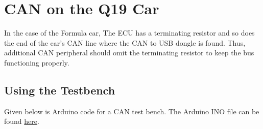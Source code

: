 \documentclass[letterpaper]{article}
\begin{document}
\section{CAN on the Q19 Car}
In the case of the Formula car, The ECU has a terminating resistor and so does
the end of the car's CAN line where the CAN to USB dongle is found. Thus,
additional CAN peripheral should omit the terminating resistor to keep the bus
functioning properly.

\subsection{Using the Testbench}
Given below is Arduino code for a CAN test bench. The Arduino INO file can be
found
\href{https://github.com/bchampp/Q20/blob/master/CAN/testbench/testbench.ino}{here}.


\end{document}
